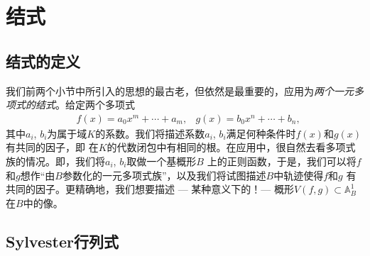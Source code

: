 \section{结式}\label{s:5.2}
\subsection{结式的定义}\label{s:5.2.1}
我们前两个小节中所引入的思想的最古老，但依然是最重要的，应用为\textit{两个一元多项式的结式}。给定两个多项式
\[
\begin{aligned}
    &f(x)=a_0x^m+\cdots+a_m,
    &g(x)=b_0x^n+\cdots+b_n,
\end{aligned}
\]
其中$a_i$, $b_i$为属于域$K$的系数。我们将描述系数$a_i$, $b_i$满足何种条件时$f(x)$和$g(x)$有共同的因子，即
在$K$的代数闭包中有相同的根。在应用中，很自然去看多项式族的情况。即，我们将$a_i$, $b_i$取做一个基概形$B$
上的正则函数，于是，我们可以将$f$和$g$想作“由$B$参数化的一元多项式族”，以及我们将试图描述$B$中轨迹使得$f$和$g$
有共同的因子。更精确地，我们想要描述 --- 某种意义下的！--- 概形$V(f,g)\subset \mathbb A_B^1$在$B$中的像。

\subsection{Sylvester行列式}\label{s:5.2.2}